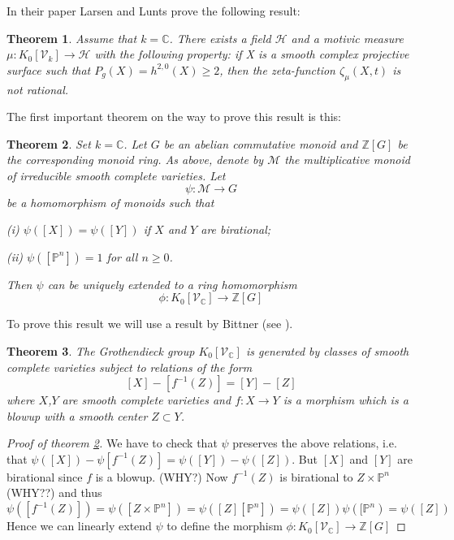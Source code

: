 \documentclass[a4paper]{article}
\theoremstyle{plain}
\newtheorem{theorem}{Theorem}
\theoremstyle{definition}
\newcommand{\gring}[1][k]{K_0[\mathcal{V}_#1]}
\begin{document}
In their paper \cite{MR1996804} Larsen and Lunts prove the following result:

\begin{theorem}
    Assume that $k = \mathbb{C}$. There exists a field $\mathcal{H}$ and a motivic measure $\mu: \gring \to \mathcal{H}$ with the following
    property: if X is a smooth complex projective surface such that $P_g(X)=h^{2,0}(X) \ge 2$, then the zeta-function $\zeta_{\mu}(X,t)$
    is not rational.
\end{theorem}

The first important theorem on the way to prove this result is this:
\begin{theorem}
    \label{th1}
    Set $k = \mathbb{C}$. Let $G$ be an abelian commutative monoid and $\mathbb{Z}[G]$ be the corresponding monoid ring. As above, denote
    by $\mathcal{M}$ the multiplicative monoid of irreducible smooth complete varieties. Let
    \[
        \psi: \mathcal{M} \to G
    \]
    be a homomorphism of monoids such that

    (i) $\psi([X]) = \psi([Y])$ if $X$ and $Y$ are birational;

    (ii) $\psi([\mathbb{P}^n]) = 1$ for all $n \ge 0$.

    Then $\psi$ can be uniquely extended to a ring homomorphism 
    \[
        \phi: \gring[\mathbb{C}] \to \mathbb{Z} [G]
    \]
\end{theorem}

To prove this result we will use a result by Bittner (see \cite[Theorem 3.1]{Bittner}).

\begin{theorem}
    The Grothendieck group $\gring[\mathbb{C}]$ is generated by classes of smooth complete varieties subject to relations of the form
    \[
        [X] - [f^{-1}(Z)] = [Y] - [Z]
    \]
    where $X$,$Y$ are smooth complete varieties and $f: X \to Y$ is a morphism which is a blowup with a smooth center $Z \subset Y$.
\end{theorem}
\begin{proof}[Proof of theorem \ref{th1}]
    We have to check that $\psi$ preserves the above relations, i.e. that $\psi([X]) - \psi[f^{-1}(Z)] = \psi([Y]) - \psi([Z])$. 
    But $[X]$ and $[Y]$ are birational since $f$ is a blowup. (WHY?)
    Now $f^{-1}(Z)$ is birational to $Z \times \mathbb{P}^n$ (WHY??) and thus 
    \[
        \psi([f^{-1}(Z)]) = \psi([Z \times \mathbb{P}^n]) = \psi([Z][\mathbb{P}^n]) = \psi([Z])\psi([\mathbb{P}^n) = \psi([Z])
    \]
    Hence we can linearly extend $\psi$ to define the morphism $\phi: \gring[\mathbb{C}] \to \mathbb{Z} [G]$
\end{proof}

{}

\end{document}
